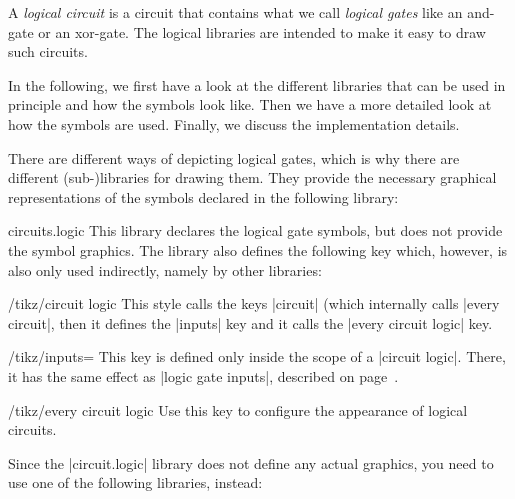 A \emph{logical circuit} is a circuit that contains what we call
\emph{logical gates} like an and-gate or an xor-gate. The logical
libraries are intended to make it easy to draw such circuits.

In the following, we first have a look at the different libraries that
can be used in principle and how the symbols look like. Then we have a
more detailed look at how the symbols are used. Finally, we discuss
the implementation details.

There are different ways of depicting logical gates, which is why there
are different (sub-)libraries for drawing them. They provide the
necessary graphical representations of the symbols declared in the
following library: 

\begin{tikzlibrary}{circuits.logic}
  This library declares the logical gate symbols, but does not 
  provide the symbol graphics.
  The library also defines the following key which, however, is also
  only used indirectly, namely by other libraries:
  \begin{key}{/tikz/circuit logic}
    This style calls the keys |circuit| (which internally calls
    |every circuit|, then it defines the |inputs| key and it calls the
    |every circuit logic| key.
    \begin{key}{/tikz/inputs=}
      This key is defined only inside the scope of a
      |circuit logic|. There, it has the same effect as
      |logic gate inputs|, described on
      page~\pageref{logic-gate-inputs}. 
    \end{key}
    \begin{stylekey}{/tikz/every circuit logic}
      Use this key to configure the appearance of logical circuits.      
    \end{stylekey}
  \end{key}
\end{tikzlibrary}

Since the |circuit.logic| library does not define any actual graphics,
you need to use one of the following libraries, instead:

